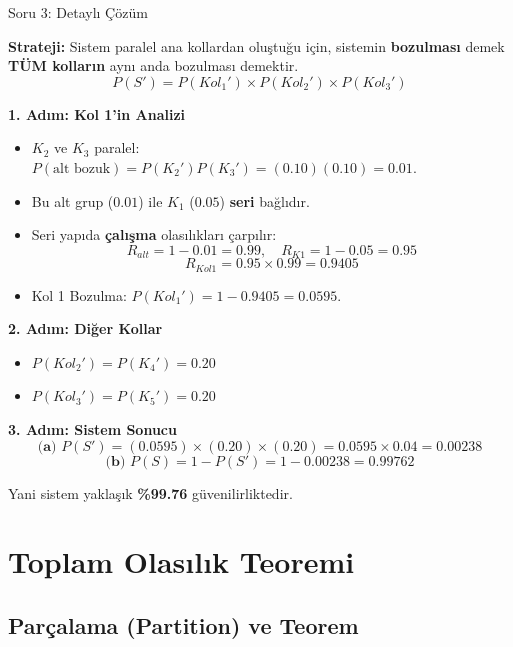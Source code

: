 \documentclass[light]{lutbeamer}
\begin{document}
\begin{frame}[allowframebreaks]{Soru 3: Detaylı Çözüm}
    \small
    {\color{red}
    \textbf{Strateji:} Sistem paralel ana kollardan oluştuğu için, sistemin \textbf{bozulması} demek \textbf{TÜM kolların} aynı anda bozulması demektir.
    \[ P(S') = P(Kol_1') \times P(Kol_2') \times P(Kol_3') \]

    \textbf{1. Adım: Kol 1'in Analizi}
    \begin{itemize}
        \item $K_2$ ve $K_3$ paralel: $P(\text{alt bozuk}) = P(K_2')P(K_3') = (0.10)(0.10) = 0.01$.
        \item Bu alt grup ($0.01$) ile $K_1$ ($0.05$) \textbf{seri} bağlıdır.
        \item Seri yapıda \textbf{çalışma} olasılıkları çarpılır:
        \[ R_{alt} = 1 - 0.01 = 0.99, \quad R_{K1} = 1 - 0.05 = 0.95 \]
        \[ R_{Kol1} = 0.95 \times 0.99 = 0.9405 \]
        \item Kol 1 Bozulma: $P(Kol_1') = 1 - 0.9405 = \mathbf{0.0595}$.
    \end{itemize}

    \textbf{2. Adım: Diğer Kollar}
    \begin{itemize}
        \item $P(Kol_2') = P(K_4') = \mathbf{0.20}$
        \item $P(Kol_3') = P(K_5') = \mathbf{0.20}$
    \end{itemize}

    \textbf{3. Adım: Sistem Sonucu}
    \[
    \textbf{(a) } P(S') = (0.0595) \times (0.20) \times (0.20) = 0.0595 \times 0.04 = \mathbf{0.00238}
    \]
    \[
    \textbf{(b) } P(S) = 1 - P(S') = 1 - 0.00238 = \mathbf{0.99762}
    \]
    
    Yani sistem yaklaşık \textbf{\%99.76} güvenilirliktedir.
    }
\end{frame}

\section{Toplam Olasılık Teoremi}
\subsection{Parçalama (Partition) ve Teorem}
\end{document}
